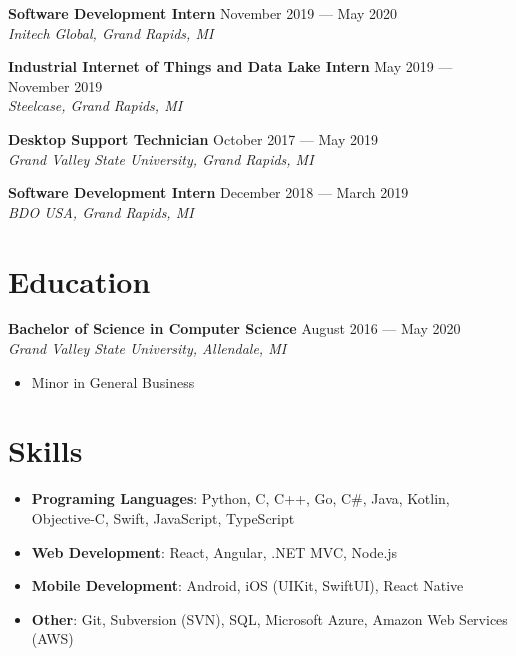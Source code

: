 \documentclass{article}
\begin{document}
\textbf{Software Development Intern} \hfill November 2019 --- May 2020\\
\textit{Initech Global, Grand Rapids, MI}
\medskip


\textbf{Industrial Internet of Things and Data Lake Intern}
\hfill May 2019 --- November 2019\\
\textit{Steelcase, Grand Rapids, MI}
\medskip


\textbf{Desktop Support Technician} \hfill October 2017 --- May 2019\\
\textit{Grand Valley State University, Grand Rapids, MI}
\medskip

\textbf{Software Development Intern} \hfill December 2018 --- March 2019\\
\textit{BDO USA, Grand Rapids, MI}
\medskip


\section*{Education}
\textbf{Bachelor of Science in Computer Science} \hfill August 2016 --- May 2020\\
\textit{Grand Valley State University, Allendale, MI}
\begin{itemize}
\item Minor in General Business
\end{itemize}
\section*{Skills}
\begin{itemize}
\item \textbf{Programing Languages}: Python, C, C++, Go, C\#, Java, Kotlin, Objective-C, Swift, JavaScript, TypeScript
\item \textbf{Web Development}: React, Angular, .NET MVC, Node.js
\item \textbf{Mobile Development}: Android, iOS (UIKit, SwiftUI), React Native
\item \textbf{Other}: Git, Subversion (SVN), SQL, Microsoft Azure, Amazon Web Services (AWS)
\end{itemize}
\end{document}
